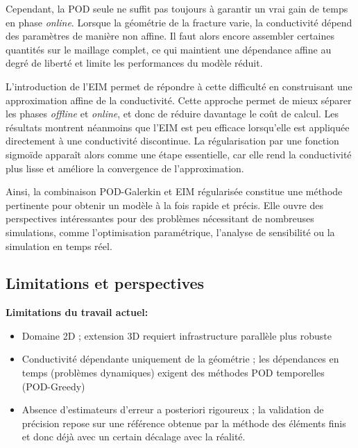 \documentclass[12pt,a4paper]{article}
\begin{document}
Cependant, la POD seule ne suffit pas toujours à garantir un vrai gain de temps en phase \textit{online}. Lorsque la géométrie de la fracture varie, la conductivité dépend des paramètres de manière non affine. Il faut alors encore assembler certaines quantités sur le maillage complet, ce qui maintient une dépendance affine au degré de liberté et limite les performances du modèle réduit.

L'introduction de l'EIM permet de répondre à cette difficulté en construisant une approximation affine de la conductivité. Cette approche permet de mieux séparer les phases \textit{offline} et \textit{online}, et donc de réduire davantage le coût de calcul. Les résultats montrent néanmoins que l'EIM est peu efficace lorsqu'elle est appliquée directement à une conductivité discontinue. La régularisation par une fonction sigmoïde apparaît alors comme une étape essentielle, car elle rend la conductivité plus lisse et améliore la convergence de l'approximation.

Ainsi, la combinaison POD-Galerkin et EIM régularisée constitue une méthode pertinente pour obtenir un modèle à la fois rapide et précis. Elle ouvre des perspectives intéressantes pour des problèmes nécessitant de nombreuses simulations, comme l'optimisation paramétrique, l'analyse de sensibilité ou la simulation en temps réel.

\subsection{Limitations et perspectives}

\textbf{Limitations du travail actuel:}
\begin{itemize}
    \item Domaine 2D ; extension 3D requiert infrastructure parallèle plus robuste
    \item Conductivité dépendante uniquement de la géométrie ; les dépendances en temps (problèmes dynamiques) exigent des méthodes POD temporelles (POD-Greedy)
    \item Absence d'estimateurs d'erreur a posteriori rigoureux ; la validation de précision repose sur une référence obtenue par la méthode des éléments finis et donc déjà avec un certain décalage avec la réalité.
\end{itemize}
\end{document}
